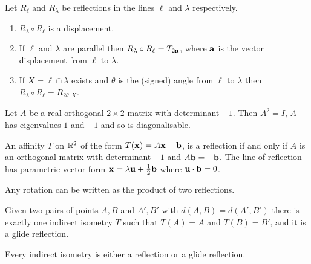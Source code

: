 \begin{theorem}
    Let \(R_\ell\) and \(R_\lambda\) be reflections in the lines \(\ell\) and \(\lambda\) respectively.
    \begin{enumerate}[label=\roman*)]
        \item \(R_\lambda \circ R_\ell\) is a displacement.
        \item If \(\ell\) and \(\lambda\) are parallel then \(R_\lambda \circ R_\ell = T_{2\mathbf{a}}\), where \(\mathbf{a}\) is the vector displacement from \(\ell\) to \(\lambda\).
        \item If \(X = \ell \cap \lambda\) exists and \(\theta\) is the (signed) angle from \(\ell\) to \(\lambda\) then \(R_\lambda \circ R_\ell = R_{2\theta, X}\).
    \end{enumerate}
\end{theorem}

\begin{lemma}
    Let \(A\) be a real orthogonal \(2 \times 2\) matrix with determinant \(-1\). Then \(A^2 = I\), \(A\) has eigenvalues \(1\) and \(-1\) and so is diagonalisable.
\end{lemma}

\begin{theorem}
    An affinity \(T\) on \(\mathbb{R}^2\) of the form \(T(\mathbf{x}) = A\mathbf{x} + \mathbf{b}\), is a reflection if and only if \(A\) is an orthogonal matrix with determinant \(-1\) and \(A\mathbf{b} = -\mathbf{b}\). The line of reflection has parametric vector form \(\mathbf{x} = \lambda\mathbf{u} + \frac{1}{2}\mathbf{b}\) where \(\mathbf{u} \cdot \mathbf{b} = 0\).
\end{theorem}

\begin{proposition}
    Any rotation can be written as the product of two reflections.
\end{proposition}


\begin{theorem}
    Given two pairs of points \(A, B\) and \(A', B'\) with \(d(A, B) = d(A', B')\) there is exactly one indirect isometry \(T\) such that \(T(A) = A\) and \(T(B) = B'\), and it is a glide reflection.
\end{theorem}

\begin{corollary}
    Every indirect isometry is either a reflection or a glide reflection.
\end{corollary}

